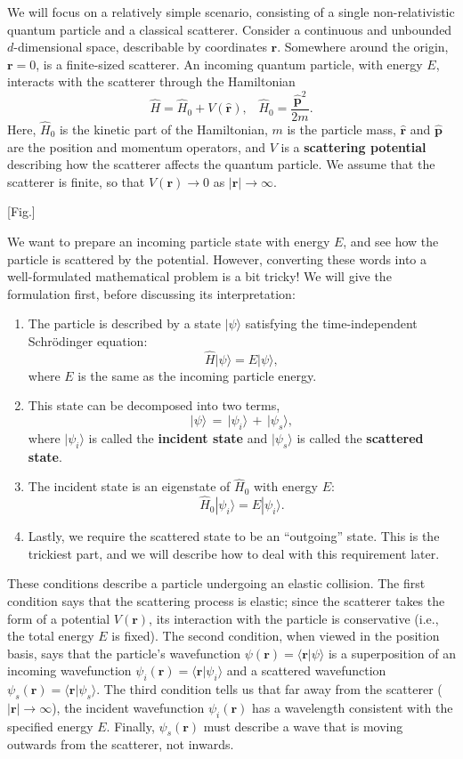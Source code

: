 \documentclass[pra,11pt]{revtex4}
\begin{document}
We will focus on a relatively simple scenario, consisting of a single
non-relativistic quantum particle and a classical scatterer.  Consider
a continuous and unbounded $d$-dimensional space, describable by
coordinates $\mathbf{r}$.  Somewhere around the origin, $\mathbf{r} =
0$, is a finite-sized scatterer.  An incoming quantum particle, with
energy $E$, interacts with the scatterer through the Hamiltonian
$$\hat{H} = \hat{H}_0 + V(\hat{\mathbf{r}}), \;\;\; \hat{H}_0 = \frac{\hat{\mathbf{p}}^2}{2m}.$$
Here, $\hat{H}_0$ is the kinetic part of the Hamiltonian, $m$ is the
particle mass, $\hat{\mathbf{r}}$ and $\hat{\mathbf{p}}$ are the
position and momentum operators, and $V$ is a \textbf{scattering
  potential} describing how the scatterer affects the quantum
particle.  We assume that the scatterer is finite, so that
$V(\mathbf{r}) \rightarrow 0$ as $|\mathbf{r}| \rightarrow \infty$.

[Fig.]

We want to prepare an incoming particle state with energy $E$, and see
how the particle is scattered by the potential.  However, converting
these words into a well-formulated mathematical problem is a bit
tricky!  We will give the formulation first, before discussing its
interpretation:
\begin{enumerate}
\item 
The particle is described by a state $|\psi\rangle$ satisfying
the time-independent Schr\"odinger equation:
$$\hat{H} |\psi\rangle = E |\psi\rangle,$$
where $E$ is the same as the incoming particle energy.  

\item
This state can be decomposed into two terms,
$$|\psi\rangle \,=\, |\psi_i\rangle \,+\, |\psi_s\rangle,$$
where $|\psi_i\rangle$ is called the \textbf{incident state} and
$|\psi_s\rangle$ is called the \textbf{scattered state}.  

\item
The incident state is an eigenstate of $\hat{H}_0$ with energy $E$:
$$\hat{H}_0 |\psi_i\rangle = E |\psi_i\rangle.$$

\item
Lastly, we require the scattered state to be an ``outgoing'' state.
This is the trickiest part, and we will describe how to deal with this
requirement later.
\end{enumerate}
These conditions describe a particle undergoing an elastic collision.
The first condition says that the scattering process is elastic; since
the scatterer takes the form of a potential $V(\mathbf{r})$, its
interaction with the particle is conservative (i.e., the total energy
$E$ is fixed).  The second condition, when viewed in the position
basis, says that the particle's wavefunction $\psi(\mathbf{r}) =
\langle \mathbf{r} |\psi\rangle$ is a superposition of an incoming
wavefunction $\psi_i(\mathbf{r}) = \langle \mathbf{r} |\psi_i\rangle$
and a scattered wavefunction $\psi_s(\mathbf{r}) = \langle \mathbf{r}
|\psi_s\rangle$.  The third condition tells us that far away from the
scatterer ($|\mathbf{r}|\rightarrow \infty$), the incident
wavefunction $\psi_i(\mathbf{r})$ has a wavelength consistent with the
specified energy $E$.  Finally, $\psi_s(\mathbf{r})$ must describe
a wave that is moving outwards from the scatterer, not inwards.
\end{document}
